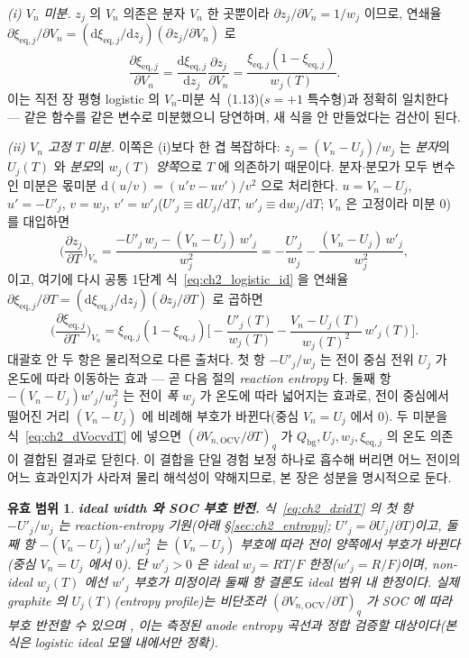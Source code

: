 \documentclass[11pt,a4paper]{article}
\newtheorem*{boundbox}{유효 범위}
\newcommand{\dd}{\mathrm{d}}
\newcommand{\eq}{\mathrm{eq}}
\newcommand{\bg}{\mathrm{bg}}
\newcommand{\OCV}{\mathrm{OCV}}
\begin{document}
\emph{(i) $V_n$ 미분.} $z_j$ 의 $V_n$ 의존은 분자 $V_n$ 한 곳뿐이라 $\partial z_j/\partial V_n=1/w_j$ 이므로, 연쇄율
$\partial\xi_{\eq,j}/\partial V_n=(\dd\xi_{\eq,j}/\dd z_j)(\partial z_j/\partial V_n)$ 로
\begin{equation}
\frac{\partial\xi_{\eq,j}}{\partial V_n}=\frac{\dd\xi_{\eq,j}}{\dd z_j}\frac{\partial z_j}{\partial V_n}
=\frac{\xi_{\eq,j}(1-\xi_{\eq,j})}{w_j(T)}.
\label{eq:ch2_dxidV}
\end{equation}
이는 직전 장 평형 logistic 의 $V_n$-미분 식~(1.13)($s=+1$ 특수형)과 정확히 일치한다 — 같은 함수를 같은 변수로
미분했으니 당연하며, 새 식을 안 만들었다는 검산이 된다.

\emph{(ii) $V_n$ 고정 $T$ 미분.} 이쪽은 (i)보다 한 겹 복잡하다: $z_j=(V_n-U_j)/w_j$ 는 \emph{분자}의 $U_j(T)$ 와
\emph{분모}의 $w_j(T)$ \emph{양쪽}으로 $T$ 에 의존하기 때문이다. 분자$\cdot$분모가 모두 변수인 미분은 몫미분
$\dd(u/v)=(u'v-uv')/v^2$ 으로 처리한다. $u=V_n-U_j$, $u'=-U'_j$, $v=w_j$, $v'=w'_j$($U'_j\equiv\dd U_j/\dd T$,
$w'_j\equiv\dd w_j/\dd T$; $V_n$ 은 고정이라 미분 $0$)를 대입하면
\begin{equation}
\Big(\frac{\partial z_j}{\partial T}\Big)_{V_n}
=\frac{-U'_j\,w_j-(V_n-U_j)\,w'_j}{w_j^2}
=-\frac{U'_j}{w_j}-\frac{(V_n-U_j)\,w'_j}{w_j^2},
\label{eq:ch2_dzdT}
\end{equation}
이고, 여기에 다시 공통 1단계 식~\eqref{eq:ch2_logistic_id} 을 연쇄율
$\partial\xi_{\eq,j}/\partial T=(\dd\xi_{\eq,j}/\dd z_j)(\partial z_j/\partial T)$ 로 곱하면
\begin{equation}
\Big(\frac{\partial\xi_{\eq,j}}{\partial T}\Big)_{V_n}
=\xi_{\eq,j}(1-\xi_{\eq,j})\Big[-\frac{U'_j(T)}{w_j(T)}-\frac{V_n-U_j(T)}{w_j(T)^2}\,w'_j(T)\Big].
\label{eq:ch2_dxidT}
\end{equation}
대괄호 안 두 항은 물리적으로 다른 출처다. 첫 항 $-U'_j/w_j$ 는 전이 중심 전위 $U_j$ 가 온도에 따라 이동하는 효과
— 곧 다음 절의 \emph{reaction entropy} 다. 둘째 항 $-(V_n-U_j)w'_j/w_j^2$ 는 전이 \emph{폭} $w_j$ 가 온도에 따라
넓어지는 효과로, 전이 중심에서 떨어진 거리 $(V_n-U_j)$ 에 비례해 부호가 바뀐다(중심 $V_n=U_j$ 에서 $0$). 두
미분을 식~\eqref{eq:ch2_dVocvdT} 에 넣으면 $(\partial V_{n,\OCV}/\partial T)_q$ 가 $Q_\bg,U_j,w_j,\xi_{\eq,j}$ 의
온도 의존이 결합된 결과로 닫힌다. 이 결합을 단일 경험 보정 하나로 흡수해 버리면 어느 전이의 어느 효과인지가 사라져
물리 해석성이 약해지므로, 본 장은 성분을 명시적으로 둔다.

\begin{boundbox}
\textbf{ideal width 와 SOC 부호 반전.} 식~\eqref{eq:ch2_dxidT} 의 첫 항 $-U'_j/w_j$ 는 reaction-entropy
기원(아래 \S\ref{sec:ch2_entropy}; $U'_j=\partial U_j/\partial T$)이고, 둘째 항 $-(V_n-U_j)w'_j/w_j^2$ 는
$(V_n-U_j)$ 부호에 따라 전이 양쪽에서 부호가 바뀐다(중심 $V_n=U_j$ 에서 $0$). 단 $w'_j>0$ 은 ideal $w_j=RT/F$
한정($w'_j=R/F$)이며, non-ideal $w_j(T)$ 에선 $w'_j$ 부호가 미정이라 둘째 항 결론도 ideal 범위 내 한정이다. 실제
graphite 의 $U_j(T)$(entropy profile)는 비단조라 $(\partial V_{n,\OCV}/\partial T)_q$ 가 SOC 에 따라 부호 반전할
수 있으며 \cite{reynier2004,thomasnewman2003}, 이는 측정된 anode entropy 곡선과 정합 검증할 대상이다(본 식은
logistic ideal 모델 내에서만 정확).
\end{boundbox}
\end{document}
